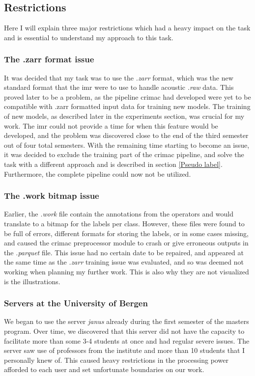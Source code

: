             
    
        \subsection{Restrictions}
            Here I will explain three major restrictions which had a heavy impact on the task and is essential to understand my approach to this task.
            \subsubsection{The .zarr format issue}
                It was decided that my task was to use the \textit{.zarr} format, which was the new standard format that the \gls{imr} were to use to handle acoustic \textit{.raw} data. This proved later to be a problem, as the pipeline \gls{crimac} had developed were yet to be compatible with .zarr formatted input data for training new models. The training of new models, as described later in the experiments section, was crucial for my work. The \gls{imr} could not provide a time for when this feature would be developed, and the problem was discovered close to the end of the third semester out of four total semesters. With the remaining time starting to become an issue, it was decided to exclude the training part of the \gls{crimac} pipeline, and solve the task with a different approach and is described in section \ref{Pseudo label}. Furthermore, the complete pipeline could now not be utilized.
            
             \subsubsection{The .work bitmap issue}\label{bitmap_error}
                Earlier, the \textit{.work} file contain the annotations from the operators and would translate to a bitmap for the labels per class. However, these files were found to be full of errors, different formats for storing the labels, or in some cases missing, and caused the \gls{crimac} preprocessor module to crash or give erroneous outputs in the \textit{.parquet} file. This issue had no certain date to be repaired, and appeared at the same time as the \textit{.zarr} training issue was evaluated, and so was deemed not working when planning my further work. This is also why they are not visualized is the illustrations.

            \subsubsection{Servers at the University of Bergen}
                We began to use the server \textit{janus} already during the first semester of the masters program. Over time, we discovered that this server did not have the capacity to facilitate more than some 3-4 students at once and had regular severe issues. The server saw use of professors from the institute and more than 10 students that I personally knew of. This caused heavy restrictions in the processing power afforded to each user and set unfortunate boundaries on our work. 
                
